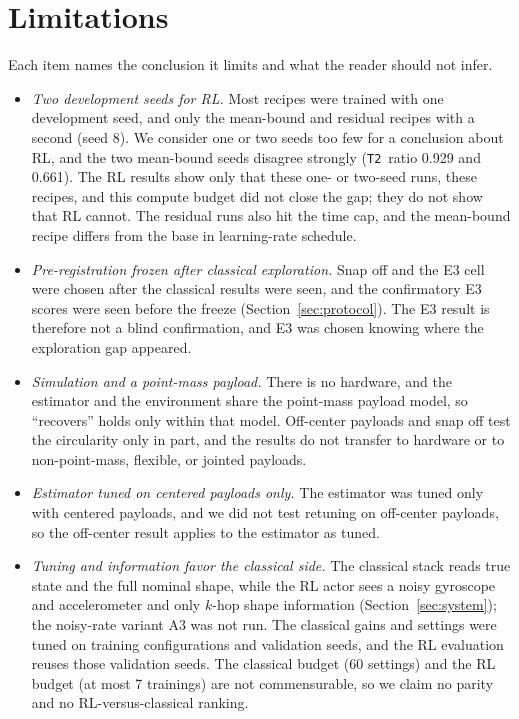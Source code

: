 \documentclass[conference]{IEEEtran}
\newcommand{\TT}{\texttt{T2}}
\begin{document}
\section{Limitations}
Each item names the conclusion it limits and what the reader should not infer.
\begin{itemize}
\item \emph{Two development seeds for RL.} Most recipes were trained with one development seed, and only the mean-bound and residual recipes with a second (seed 8). We consider one or two seeds too few for a conclusion about RL, and the two mean-bound seeds disagree strongly (\TT\ ratio 0.929 and 0.661). The RL results show only that these one- or two-seed runs, these recipes, and this compute budget did not close the gap; they do not show that RL cannot. The residual runs also hit the time cap, and the mean-bound recipe differs from the base in learning-rate schedule. %
\item \emph{Pre-registration frozen after classical exploration.} Snap off and the E3 cell were chosen after the classical results were seen, and the confirmatory E3 scores were seen before the freeze (Section~\ref{sec:protocol}). The E3 result is therefore not a blind confirmation, and E3 was chosen knowing where the exploration gap appeared.
\item \emph{Simulation and a point-mass payload.} There is no hardware, and the estimator and the environment share the point-mass payload model, so ``recovers'' holds only within that model. Off-center payloads and snap off test the circularity only in part, and the results do not transfer to hardware or to non-point-mass, flexible, or jointed payloads. %
\item \emph{Estimator tuned on centered payloads only.} The estimator was tuned only with centered payloads, and we did not test retuning on off-center payloads, so the off-center result applies to the estimator as tuned. %
\item \emph{Tuning and information favor the classical side.} The classical stack reads true state and the full nominal shape, while the RL actor sees a noisy gyroscope and accelerometer and only $k$-hop shape information (Section~\ref{sec:system}); the noisy-rate variant A3 was not run. The classical gains and settings were tuned on training configurations and validation seeds, and the RL evaluation reuses those validation seeds. The classical budget (60 settings) and the RL budget (at most 7 trainings) are not commensurable, so we claim no parity and no RL-versus-classical ranking. %

\end{itemize}
\end{document}
